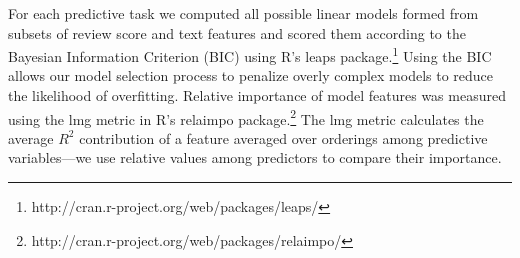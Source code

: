\documentclass[letterpaper]{article}
\begin{document}
For each predictive task we computed all possible linear models formed from subsets of review score and text features and scored them according to the Bayesian Information Criterion (BIC) using R's leaps package.\footnote{http://cran.r-project.org/web/packages/leaps/} Using the BIC allows our model selection process to penalize overly complex models to reduce the likelihood of overfitting. Relative importance of model features was measured using the lmg metric in R's relaimpo package.\footnote{http://cran.r-project.org/web/packages/relaimpo/} The lmg metric calculates the average $R^2$ contribution of a feature averaged over orderings among predictive variables---we use relative values among predictors to compare their importance.


\end{document}
